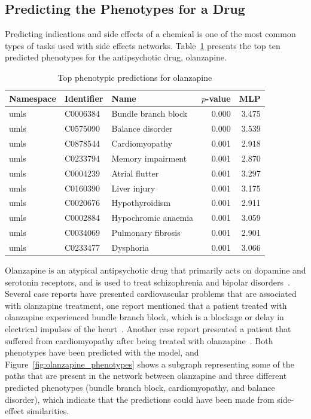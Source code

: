 \subsection{Predicting the Phenotypes for a Drug}

Predicting indications and side effects of a chemical is one of the most common types of tasks used with side effects networks.
Table~\ref{tab:drug_phenotype} presents the top ten predicted phenotypes for the antipsychotic drug, olanzapine.

\begin{table}[!ht]
    \centering
    \begin{tabular}{|l|l|l|r|r|}
        \hline
        \textbf{Namespace} & \textbf{Identifier} & \textbf{Name} & \textbf{$p$-value} & \textbf{MLP} \\
        \hline
        umls & C0006384 & Bundle branch block & 0.000 & 3.475 \\
        \hline
        umls & C0575090 & Balance disorder & 0.000 & 3.539 \\
        \hline
        umls & C0878544 & Cardiomyopathy & 0.001 & 2.918 \\
        \hline
        umls & C0233794 & Memory impairment & 0.001 & 2.870 \\
        \hline
        umls & C0004239 & Atrial flutter & 0.001 & 3.297 \\
        \hline
        umls & C0160390 & Liver injury & 0.001 & 3.175 \\
        \hline
        umls & C0020676 & Hypothyroidism & 0.001 & 2.911 \\
        \hline
        umls & C0002884 & Hypochromic anaemia & 0.001 & 3.059 \\
        \hline
        umls & C0034069 & Pulmonary fibrosis & 0.001 & 2.901 \\
        \hline
        umls & C0233477 & Dysphoria & 0.001 & 3.066 \\
        \hline
    \end{tabular}
    \caption{Top phenotypic predictions for olanzapine}
    \label{tab:drug_phenotype}
\end{table}

Olanzapine is an atypical antipsychotic drug that primarily acts on dopamine and serotonin receptors, and is used to treat schizophrenia and bipolar disorders~\cite{thomas_olanzapine_2019}.
Several case reports have presented cardiovascular problems that are associated with olanzapine treatment, one report mentioned that a patient treated with olanzapine experienced bundle branch block, which is a blockage or delay in electrical impulses of the heart~\cite{ninan_case_2017}.
Another case report presented a patient that suffered from cardiomyopathy after being treated with olanzapine~\cite{puttegowda_olanzapine_2016}.
Both phenotypes have been predicted with the model, and Figure~\ref{fig:olanzapine_phenotypes} shows a subgraph representing some of the paths that are present in the network between olanzapine and three different predicted phenotypes (bundle branch block, cardiomyopathy, and balance disorder), which indicate that the predictions could have been made from side-effect similarities.

